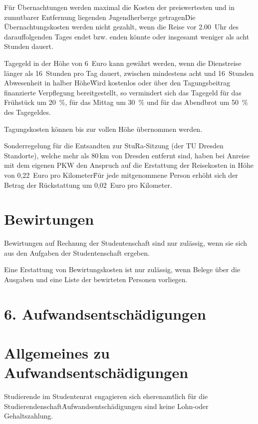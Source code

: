 \begin{multicols}{2}
\Abs \Satz Für Übernachtungen werden maximal die Kosten der preiswertesten und in zumutbarer Entfernung liegenden Jugendherberge getragen\. Die Übernachtungskosten werden nicht gezahlt, wenn die Reise vor 2.00~Uhr des darauffolgenden Tages endet bzw. enden könnte oder insgesamt weniger als acht Stunden dauert. 

\Abs \Satz Tagegeld in der Höhe von 6~Euro kann gewährt werden, wenn die Dienstreise länger als 16~Stunden pro Tag dauert, zwischen mindestens acht und 16~Stunden Abwesenheit in halber Höhe\. Wird kostenlos oder über den Tagungsbeitrag finanzierte Verpflegung bereitgestellt, so vermindert sich das Tagegeld für das Frühstück um 20~\%, für das Mittag um 30~\% und für das Abendbrot um 50~\% des Tagegeldes.

\Abs \Satz Tagungskosten können bis zur vollen Höhe übernommen werden.

\Abs \Satz Sonderregelung für die Entsandten zur StuRa-Sitzung (der TU Dresden Standorte), welche mehr als 80\,km von Dresden entfernt sind, haben bei Anreise mit dem eigenen PKW den Anspruch auf die Erstattung der Reisekosten in Höhe von 0,22~Euro pro Kilometer\. Für jede mitgenommene Person erhöht sich der Betrag der Rückstattung um 0,02~Euro pro Kilometer.


\section{Bewirtungen}

\Abs \Satz Bewirtungen auf Rechnung der Studentenschaft sind nur zulässig, wenn sie sich aus den Aufgaben der Studentenschaft ergeben.

\Abs \Satz Eine Erstattung von Bewirtungskosten ist nur zulässig, wenn Belege über die Ausgaben und eine Liste der bewirteten Personen vorliegen.


\section*{6. Aufwandsentschädigungen}



\section{Allgemeines zu Aufwandsentschädigungen}

\Abs \Satz Studierende im Studentenrat engagieren sich eherenamtlich für die Studierendenschaft\. Aufwandsentschädigungen sind keine Lohn-oder Gehaltszahlung. 


\end{multicols}
